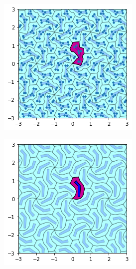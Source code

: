 \documentclass[11pt]{article}
\begin{document}
\begin{figure}[H]
\begin{subfigure}[b]{0.3\textwidth}
    \includegraphics[width=\textwidth]{output_18_0.png}
    \label{fig:f8}
  \end{subfigure}
  \begin{subfigure}[b]{0.3\textwidth}
    \includegraphics[width=\textwidth]{output_21_2.png}
    \label{fig:f9}
  \end{subfigure}
\end{figure}
\end{document}
